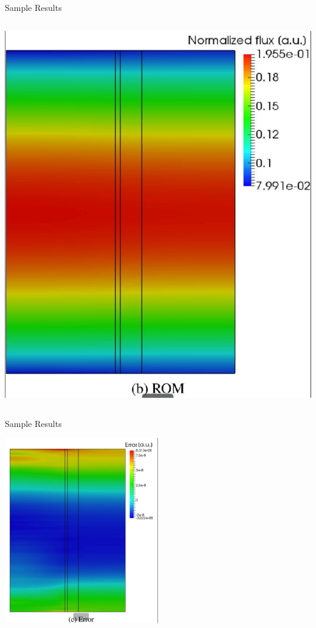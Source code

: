 \documentclass{beamer}
\begin{document}
\begin{frame}{Sample Results}
\begin{columns}
\begin{column}{0.5\textwidth}
\begin{center}
            \includegraphics[width=\textwidth]{2.pdf}
            \end{center}
        \end{column}
    \end{columns}
\end{frame}

\begin{frame}{Sample Results}
            \begin{center}
                \includegraphics[width=0.5\textwidth]{3.pdf}
            \end{center}
       
\end{frame}
 
\end{document}
